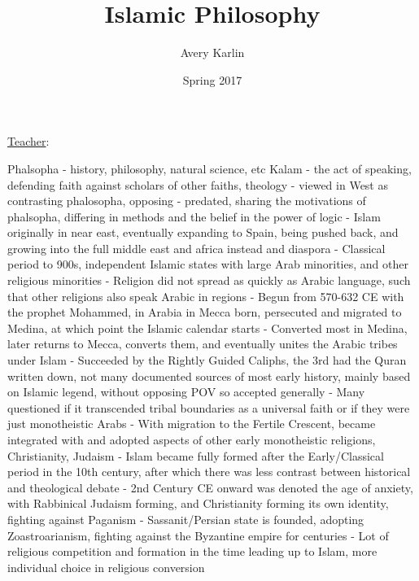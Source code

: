 \documentclass[11 pt, twoside]{article}
\begin{document}
\title{Islamic Philosophy}
\author{Avery Karlin}
\date{Spring 2017}
\newcommand{\teacher}{}

\maketitle
\newpage
\hypertarget{content}{\tableofcontents}
\vspace{11pt}
\noindent
\underline{Teacher}: \teacher
\newpage

Phalsopha - history, philosophy, natural science, etc
Kalam - the act of speaking, defending faith against scholars of other faiths, theology
	  - viewed in West as contrasting phalosopha, opposing
	  - predated, sharing the motivations of phalsopha, differing in methods and the belief in the power of logic
- Islam originally in near east, eventually expanding to Spain, being pushed back, and growing into the full middle east and africa instead and diaspora
- Classical period to 900s, independent Islamic states with large Arab minorities, and other religious minorities
	- Religion did not spread as quickly as Arabic language, such that other religions also speak Arabic in regions
	- Begun from 570-632 CE with the prophet Mohammed, in Arabia in Mecca born, persecuted and migrated to Medina, at which point the Islamic calendar starts
	- Converted most in Medina, later returns to Mecca, converts them, and eventually unites the Arabic tribes under Islam
	- Succeeded by the Rightly Guided Caliphs, the 3rd had the Quran written down, not many documented sources of most early history, mainly based on Islamic legend, without opposing POV so accepted generally
	- Many questioned if it transcended tribal boundaries as a universal faith or if they were just monotheistic Arabs
	- With migration to the Fertile Crescent, became integrated with and adopted aspects of other early monotheistic religions, Christianity, Judaism
- Islam became fully formed after the Early/Classical period in the 10th century, after which there was less contrast between historical and theological debate
- 2nd Century CE onward was denoted the age of anxiety, with Rabbinical Judaism forming, and Christianity forming its own identity, fighting against Paganism
	- Sassanit/Persian state is founded, adopting Zoastroarianism, fighting against the Byzantine empire for centuries
	- Lot of religious competition and formation in the time leading up to Islam, more individual choice in religious conversion
\end{document}
